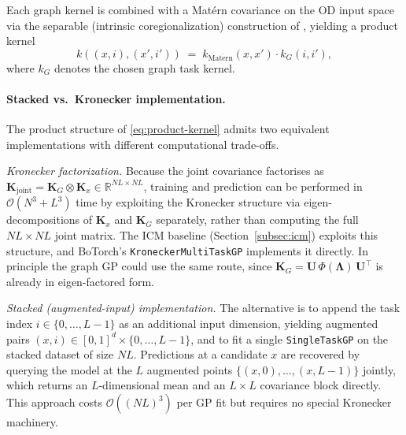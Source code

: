 \documentclass[11pt]{article}
\begin{document}
Each graph kernel is combined with a Mat\'{e}rn covariance on the OD
input space via the separable (intrinsic coregionalization) construction
of \textcite{borovitskiy2021matern}, yielding a product kernel
\begin{equation}
    k\!\left((x,i),(x',i')\right)
    \;=\;
    k_{\mathrm{Mat\acute{e}rn}}(x, x') \cdot k_{G}(i, i'),
    \label{eq:product-kernel}
\end{equation}
where $k_G$ denotes the chosen graph task kernel.

\paragraph{Stacked vs.\ Kronecker implementation.}
The product structure of \eqref{eq:product-kernel} admits two equivalent
implementations with different computational trade-offs.

\emph{Kronecker factorization.}
Because the joint covariance factorises as
$\mathbf{K}_{\mathrm{joint}} = \mathbf{K}_G \otimes \mathbf{K}_x
\in \mathbb{R}^{NL \times NL}$,
training and prediction can be performed in
$\mathcal{O}(N^3 + L^3)$ time by exploiting the Kronecker structure via
eigen-decompositions of $\mathbf{K}_x$ and $\mathbf{K}_G$ separately,
rather than computing the full $NL \times NL$ joint matrix. The ICM
baseline (Section~\ref{subsec:icm}) exploits this structure, and BoTorch's
\texttt{KroneckerMultiTaskGP} implements it directly. In principle the
graph GP could use the same route, since
$\mathbf{K}_G = \mathbf{U}\,\Phi(\boldsymbol{\Lambda})\,\mathbf{U}^\top$
is already in eigen-factored form.

\emph{Stacked (augmented-input) implementation.}
The alternative is to append the task index $i \in \{0,\dots,L-1\}$ as
an additional input dimension, yielding augmented pairs
$(x, i) \in [0,1]^d \times \{0,\dots,L-1\}$, and to fit a single
\texttt{SingleTaskGP} on the stacked dataset of size $NL$. Predictions
at a candidate $x$ are recovered by querying the model at the $L$
augmented points $\{(x, 0), \dots, (x, L-1)\}$ jointly, which returns
an $L$-dimensional mean and an $L \times L$ covariance block directly.
This approach costs $\mathcal{O}((NL)^3)$ per GP fit but requires no
special Kronecker machinery.
\end{document}

